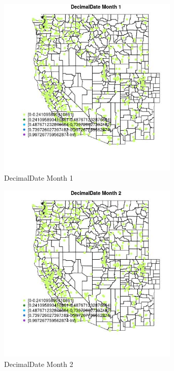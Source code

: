\begin{figure} 
\centering  
\includegraphics[width=0.77\textwidth]{Code_Outputs/Report_ML_input_PM25_Step4_part_e_de_duplicated_aveswNAs_MapObsMo1DecimalDate.jpg} 
\caption{\label{fig:Report_ML_input_PM25_Step4_part_e_de_duplicated_aveswNAsMapObsMo1DecimalDate}DecimalDate Month 1} 
\end{figure} 
 

\begin{figure} 
\centering  
\includegraphics[width=0.77\textwidth]{Code_Outputs/Report_ML_input_PM25_Step4_part_e_de_duplicated_aveswNAs_MapObsMo2DecimalDate.jpg} 
\caption{\label{fig:Report_ML_input_PM25_Step4_part_e_de_duplicated_aveswNAsMapObsMo2DecimalDate}DecimalDate Month 2} 
\end{figure} 
 

